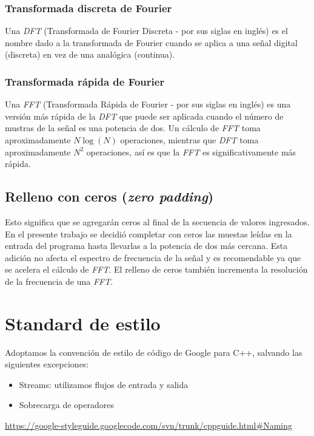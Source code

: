 \documentclass{article}
\begin{document}
    \subsubsection{Transformada discreta de Fourier}
      Una \textit{DFT} (Transformada de Fourier Discreta - por sus siglas en inglés) es el nombre
      dado a la transformada de Fourier cuando se aplica a una señal digital (discreta) en vez de una
      analógica (continua).
	  
    \subsubsection{Transformada rápida de Fourier}
      Una \textit{FFT} (Transformada Rápida de Fourier - por sus siglas en inglés) es una versión más rápida
      de la \textit{DFT} que puede ser aplicada cuando el número de mustras de la señal es una potencia de dos.
	  Un cálculo de \textit{FFT} toma aproximadamente $N \log (N)$ operaciones, mientras que \textit{DFT}
      toma aproximadamente $N^2$ operaciones, así es que la \textit{FFT} es significativamente más rápida.

  \subsection{Relleno con ceros (\textit{zero padding})}
    Esto significa que se agregarán ceros al final de la secuencia de valores ingresados. En
    el presente trabajo se decidió completar con ceros las muestas leídas en la entrada del programa
    hasta llevarlas a la potencia de dos más cercana. Esta adición no afecta el espectro de frecuencia
    de la señal y es recomendable ya que se acelera el cálculo de \textit{FFT}. El relleno de ceros también incrementa
    la resolución de la frecuencia de una \textit{FFT}.

\section{Standard de estilo}
  Adoptamos la convención de estilo de código de Google para C++, salvando las siguientes excepciones:
  \begin{itemize}
    \item Streams: utilizamos flujos de entrada y salida
    \item Sobrecarga de operadores
  \end{itemize}
  \url{https://google-styleguide.googlecode.com/svn/trunk/cppguide.html#Naming}
\end{document}
